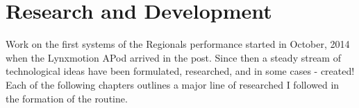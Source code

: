 	\part{Research and Development}
    \label{RandD}
		Work on the first systems of the Regionals performance started in October, 2014 when the Lynxmotion APod arrived in the post. Since then a steady stream of technological ideas have been formulated, researched, and in some cases - created!\\
		
		Each of the following chapters outlines a major line of researched I followed in the formation of the routine.\\
        
		           
        
           		
							
		                            
                            
		
			
		
        
        
        
        
        
         
        
                                       							            
		            